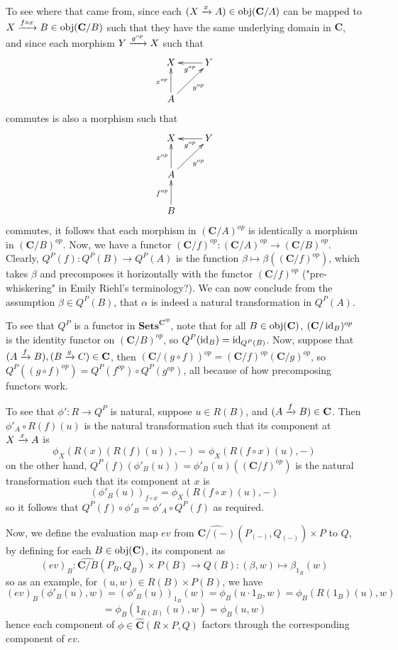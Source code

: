 To see where that came from, since each $(X\xrightarrow{x}A)\in\operatorname{\operatorname{obj}}(\mathbf{C}/A)$ can be mapped to $X\xrightarrow{f\circ x}B\in\operatorname{\operatorname{obj}}(\mathbf{C}/B)$ such that they have the same underlying domain in $\mathbf{C}$,
and since each morphism $Y\xrightarrow{g^{op}}X$ such that 
\[\xymatrix{
    X & Y \ar@{->}[l]^{g^{op}} \\
    A \ar@{->}[ru]_{y^{op}} \ar@{->}[u]^{x^{op}} & 
    }\]
commutes is also a morphism such that
\[\xymatrix{
    X & Y \ar@{->}[l]^{g^{op}} \\
    A \ar@{->}[ru]_{y^{op}} \ar@{->}[u]^{x^{op}} &  \\
    B \ar@{->}[u]^{f^{op}} & 
    }\]
commutes, it follows that each morphism in $(\mathbf{C}/A)^{op}$ is identically a morphism in $(\mathbf{C}/B)^{op}$. Now, we have a functor $(\mathbf{C}/f)^{op}:(\mathbf{C}/A)^{op}\to(\mathbf{C}/B)^{op}$. Clearly, $Q^P(f):Q^P(B)\to Q^P(A)$ is the function $\beta\mapsto\beta((\mathbf{C}/f)^{op})$, which takes $\beta$ and precomposes it horizontally with the functor $(\mathbf{C}/f)^{op}$ ("pre-whiskering" in Emily Riehl's terminology?). We can now conclude from the assumption $\beta\in Q^P(B)$, that $\alpha$ is indeed a natural transformation in $Q^P(A)$.

To see that $Q^P$ is a functor in $\mathbf{Sets}^{\mathbf{C}^{op}}$, note that for all $B\in\operatorname{\operatorname{obj}}(\mathbf{C})$, $(\mathbf{C}/\operatorname{\operatorname{id}}_B)^{op}$ is the identity functor on $(\mathbf{C}/B)^{op}$, so $Q^P(\operatorname{\operatorname{id}}_B)=\operatorname{\operatorname{id}}_{Q^P(B)}$. Now, suppose that $(A\xrightarrow{f}B),(B\xrightarrow{g}C)\in\mathbf{C}$, then $(\mathbf{C}/(g\circ f))^{op}=(\mathbf{C}/f)^{op}(\mathbf{C}/g)^{op}$, so $Q^P((g\circ f)^{op})=Q^P(f^{op})\circ Q^P(g^{op})$, all because of how precomposing functors work.

To see that $\phi':R\to Q^P$ is natural, suppose $u\in R(B)$, and $(A\xrightarrow{f}B)\in\mathbf{C}$. Then $\phi'_A\circ R(f)(u)$ is the natural transformation such that its component at $X\xrightarrow{x}A$ is
\[\phi_X(R(x)(R(f)(u)),-)=\phi_X(R(f\circ x)(u),-)\]
on the other hand, $Q^P(f)(\phi'_B(u))=\phi'_B(u)((\mathbf{C}/f)^{op})$ is the natural transformation such that its component at $x$ is
\[(\phi'_B(u))_{f\circ x}=\phi_X(R(f\circ x)(u),-)\]
so it follows that $Q^P(f)\circ\phi'_B=\phi'_A\circ Q^P(f)$ as required.

Now, we define the evaluation map $ev$ from $\widehat{\mathbf{C}/(-)}(P_{(-)},Q_{(-)})\times P$ to $Q$, by defining for each $B\in\operatorname{\operatorname{obj}}(\mathbf{C})$, its component as
\[(ev)_B:\widehat{\mathbf{C}/B}(P_B,Q_B)\times P(B)\to Q(B):(\beta,w)\mapsto\beta_{1_B}(w)\]
so as an example, for $(u,w)\in R(B)\times P(B)$, we have
\[(ev)_B(\phi'_B(u),w)=(\phi'_B(u))_{1_B}(w)=\phi_B(u\cdot1_B,w)=\phi_B(R(1_B)(u),w)\]
\[=\phi_B(1_{R(B)}(u),w)=\phi_B(u,w)\]
hence each component of $\phi\in\widehat{\mathbf{C}}(R\times P,Q)$ factors through the corresponding component of $ev$.

